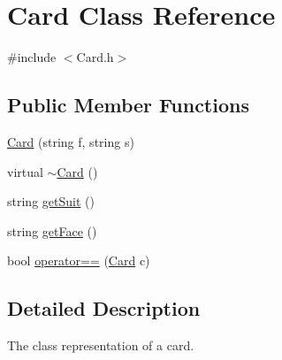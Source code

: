 \hypertarget{class_card}{\section{Card Class Reference}
\label{class_card}
}


{\ttfamily \#include $<$Card.\-h$>$}

\subsection*{Public Member Functions}
\begin{DoxyCompactItemize}
\item 
\hyperlink{class_card_ac116b6ce69235c84afb8740b162d665a}{Card} (string f, string s)
\item 
virtual \hyperlink{class_card_a2b09fd7321b238b45b2ad2f034760e5d}{$\sim$\-Card} ()
\item 
string \hyperlink{class_card_a6bda7d706eb87b009c94ae2a9654f6d9}{get\-Suit} ()
\item 
string \hyperlink{class_card_afb2b73b451cc753663edab09abfc4bd6}{get\-Face} ()
\item 
bool \hyperlink{class_card_ac1217b730fc4f164ca1d0aa4b0c2bd6e}{operator==} (\hyperlink{class_card}{Card} c)
\end{DoxyCompactItemize}


\subsection{Detailed Description}
The class representation of a card. 

